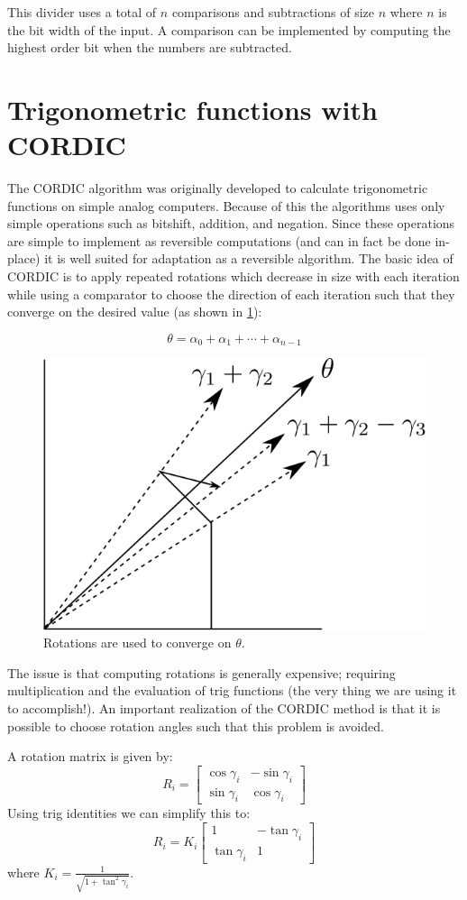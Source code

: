     This divider uses a total of $n$ comparisons and subtractions of size $n$
    where $n$ is the bit width of the input. A comparison can be implemented by
    computing the highest order bit when the numbers are subtracted.

\section{Trigonometric functions with CORDIC}

    The CORDIC\cite{V:1959} algorithm was originally developed to calculate
    trigonometric functions on simple analog computers. Because of this the
    algorithms uses only simple operations such as bitshift, addition, and
    negation. Since these operations are simple to implement as reversible
    computations (and can in fact be done in-place) it is well suited for
    adaptation as a reversible algorithm. The basic idea of CORDIC is to apply
    repeated rotations which decrease in size with each iteration while using
    a comparator to choose the direction of each iteration such that they
    converge on the desired value (as shown in \cref{fig:cordic-rot}):

    \[ \theta = \alpha_0 + \alpha_1 + \dotsb + \alpha_{n-1} \]

    \begin{figure}
        \capstart
        \centering
        \includegraphics[width=.5\textwidth]{images/cordic-rot}
        \caption{Rotations are used to converge on $\theta$.}
        \label{fig:cordic-rot}
    \end{figure}

	The issue is that computing rotations is generally expensive; requiring
	multiplication and the evaluation of trig functions (the very thing we
	are using it to accomplish!). An important realization of the CORDIC
	method is that it is possible to choose rotation angles such that this
	problem is avoided.

        A rotation matrix is given by:
        \[
          R_i = \begin{bmatrix}
            \cos\gamma_i & -\sin\gamma_i \\
            \sin\gamma_i & \cos\gamma_i
          \end{bmatrix}
        \]
        Using trig identities we can simplify this to:
        \[
          R_i = K_i
                \begin{bmatrix}
                  1            & -\tan\gamma_i \\
                  \tan\gamma_i & 1
                \end{bmatrix}
        \]
        where $K_i = \frac{1}{\sqrt{1+\tan^2\gamma_i}}$.

